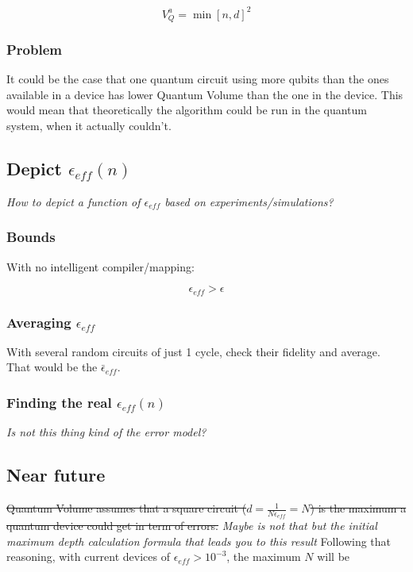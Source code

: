 \documentclass[11pt]{article}
\begin{document}
$$V_Q^a = \min \left[ n,d \right]^2$$

\subsubsection{Problem}
\label{sec:org8061a7a}

It could be the case that one quantum circuit using more qubits than the ones available in a device has lower Quantum Volume than the one in the device. This would mean that theoretically the algorithm could be run in the quantum system, when it actually couldn't.

\subsection{Depict \(\epsilon_{eff}(n)\)}
\label{sec:org4f9e540}

\emph{How to depict a function of \(\epsilon_{eff}\) based on experiments/simulations?}

\subsubsection{Bounds}
\label{sec:org495c2a6}

With no intelligent compiler/mapping:

$$\epsilon_{eff} > \epsilon$$

\subsubsection{Averaging \(\epsilon_{eff}\)}
\label{sec:org9f1b945}

With several random circuits of just 1 cycle, check their fidelity and average. That would be the \(\bar{\epsilon}_{eff}\).

\subsubsection{Finding the real \(\epsilon_{eff} (n)\)}
\label{sec:orgffb1970}

\emph{Is not this thing kind of the error model?}

\subsection{Near future}
\label{sec:org68f0809}

\sout{Quantum Volume assumes that a square circuit (\(d = \frac{1}{N \epsilon_{eff}} = N\)) is the maximum a quantum device could get in term of errors.}
\emph{Maybe is not that but the initial maximum depth calculation formula that leads you to this result}
Following that reasoning, with current devices of \(\epsilon_{eff} > 10^{-3}\), the maximum \(N\) will be
\end{document}
